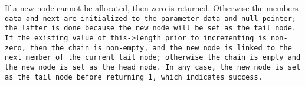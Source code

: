 
If a new node cannot be allocated, then zero is returned.
Otherwise the members \tt{data} and \tt{next} are initialized
to the parameter \tt{data} and null pointer; the latter is
done because the new node will be set as the \tt{tail} node.
If the existing value of \tt{this->length} prior to incrementing is non-zero,
then the chain is non-empty, and the new node is linked
to the \tt{next} member of the current \tt{tail} node;
otherwise the chain is empty and the new node is set as the \tt{head} node.
In any case, the new node is set as the \tt{tail}
node before returning \tt{1}, which indicates success.
